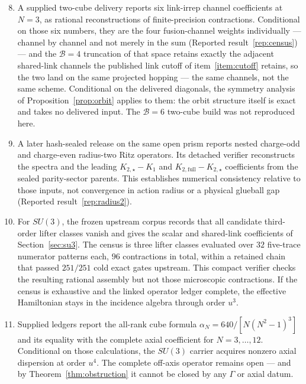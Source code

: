 \documentclass[11pt]{article}
\theoremstyle{plain}
\theoremstyle{definition}
\theoremstyle{remark}
\begin{document}
\begin{enumerate}\setcounter{enumi}{7}\itemsep2pt
\item A supplied two-cube delivery reports six link-irrep channel
  coefficients at $N=3$, as rational reconstructions of finite-precision
  contractions. Conditional on those six numbers, they are the four
  fusion-channel weights individually --- channel by channel and not merely in
  the sum (Reported result~\ref{rep:census}) --- and the $\mathcal B=4$ truncation of
  that space retains exactly the adjacent shared-link channels the published
  link cutoff of item~\ref{item:cutoff} retains, so the two land on the same
  projected hopping --- the same channels, not the same scheme. Conditional on the delivered diagonals, the symmetry
  analysis of Proposition~\ref{prop:orbit} applies to them: the orbit structure
  itself is exact and takes no delivered input.
  The $\mathcal B=6$ two-cube build was not reproduced here.
\item A later hash-sealed release on the same open prism reports nested
  charge-odd and charge-even radius-two Ritz operators. Its detached verifier
  reconstructs the spectra and the leading $K_{2,\star}-K_1$ and
  $K_{2,\mathrm{full}}-K_{2,\star}$ coefficients from the sealed
  parity-sector parents. This establishes numerical consistency relative to
  those inputs, not convergence in action radius or a physical glueball gap
  (Reported result~\ref{rep:radius2}).
\item\label{item:domino} For $SU(3)$, the frozen upstream corpus records that
  all candidate third-order lifter classes vanish and gives the scalar and
  shared-link coefficients of Section~\ref{sec:su3}. The census is three
  lifter classes evaluated over $32$ five-trace numerator patterns each, $96$
  contractions in total, within a retained chain that passed $251/251$ cold
  exact gates upstream. This compact verifier checks the resulting rational
  assembly but not those microscopic contractions. If the census is exhaustive
  and the linked operator ledger complete, the effective Hamiltonian stays in
  the incidence algebra through order $u^3$.
\item Supplied ledgers report the all-rank cube formula
  $\alpha_N=640/[N(N^2-1)^3]$ and its equality with the complete axial
  coefficient for $N=3,\dots,12$. Conditional on those calculations, the
  $SU(3)$ carrier acquires nonzero axial dispersion at order $u^4$. The
  complete off-axis operator remains open --- and by
  Theorem~\ref{thm:obstruction} it cannot be closed by any $\Gamma$ or axial
  datum.
\end{enumerate}
\end{document}
